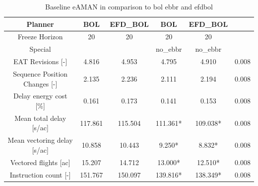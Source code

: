 \begin{table}[htbp]
\caption{Baseline eAMAN in comparison to bol ebbr and efdbol}
\begin{center}
\footnotesize
\setlength{\tabcolsep}{3pt}
\renewcommand{\arraystretch}{1.000}
\begin{tabular}{|c|c|c|c|c|c|}
\hline
Planner & BOL & EFD\_BOL & BOL & EFD\_BOL &  \\
\hline
Freeze Horizon & 20 & 20 & 20 & 20 &  \\
\hline
Special &  &  & no\_ebbr & no\_ebbr &  \\
\hline
EAT Revisions [-] & 4.816 & 4.953 & 4.795 & 4.910 & 0.008 \\
\hline
Sequence Position Changes [-] & 2.135 & 2.236 & 2.111 & 2.194 & 0.008 \\
\hline
Delay energy cost [\%] & 0.161 & 0.173 & 0.141 & 0.153 & 0.008 \\
\hline
Mean total delay [s/ac] & 117.861 & 115.504 & 111.361* & 109.038* & 0.008 \\
\hline
Mean vectoring delay [s/ac] & 10.858 & 10.443 & 9.250* & 8.832* & 0.008 \\
\hline
Vectored flights [ac] & 15.207 & 14.712 & 13.000* & 12.510* & 0.008 \\
\hline
Instruction count [-] & 151.767 & 150.097 & 139.816* & 138.349* & 0.008 \\
\hline
\end{tabular}
\label{tab:baseline\_eaman\_in\_comparison\_to\_bol\_ebbr\_and\_efdbol}
\end{center}
\end{table}
